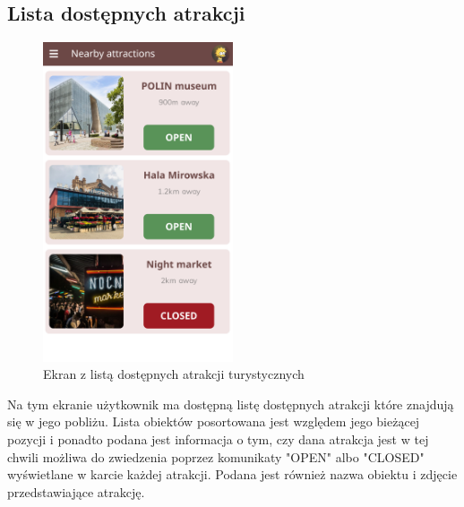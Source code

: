 \subsection{Lista dostępnych atrakcji}
\begin{figure}[H]
    \centering
    \includegraphics[width=0.5\textwidth]{img/4/lista.png}
    \caption{Ekran z listą dostępnych atrakcji turystycznych}
    \label{fig:proj-wstepny-lista}
\end{figure}

Na tym ekranie użytkownik ma dostępną listę dostępnych atrakcji które znajdują się w jego pobliżu. Lista obiektów posortowana jest względem jego bieżącej pozycji i ponadto podana jest informacja o tym, czy dana atrakcja jest w tej chwili możliwa do zwiedzenia poprzez komunikaty "OPEN" albo "CLOSED" wyświetlane w karcie każdej atrakcji. Podana jest również nazwa obiektu i zdjęcie przedstawiające atrakcję.